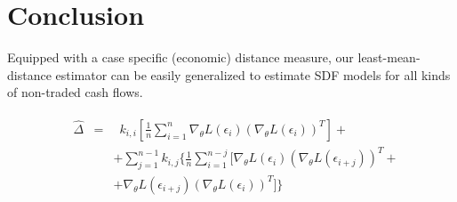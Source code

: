 \documentclass[12pt]{article}
\begin{document}
\section{Conclusion}

Equipped with a case specific (economic) distance measure, our least-mean-distance estimator can be easily generalized to estimate SDF models for all kinds of non-traded cash flows.



\begin{align}
\begin{aligned}
&\hat{\Delta} & = &
\enspace k_{i,i}
\left[
\frac{1}{n}
\sum_{i=1}^n
\nabla_{\theta} L \left( \epsilon_i \right)
\left(
\nabla_{\theta} L \left( \epsilon_i \right)
\right)^T
\right]  + \\
& &  & +
\sum_{j=1}^{n-1}
k_{i,j}
\{
\frac{1}{n}
\sum_{i=1}^{n-j}
[
\nabla_{\theta} L \left( \epsilon_i \right)
\left(
\nabla_{\theta} L \left( \epsilon_{i+j} \right)
\right)^T + \\
& &  & +
\nabla_{\theta} L \left( \epsilon_{i+j} \right)
\left(
\nabla_{\theta} L \left( \epsilon_i \right)
\right)^T
]
\}
\end{aligned}
\end{align}










\newpage
\end{document}
